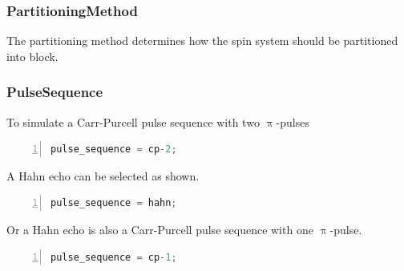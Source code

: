 \documentclass{book}
\begin{document}
\subsubsection{PartitioningMethod} %
The partitioning method determines how the spin system should be partitioned
into block. 
\subsubsection{PulseSequence} %
To simulate a Carr-Purcell pulse sequence with two $\uppi$-pulses   
\begin{lstlisting}[frame=single,numbers=left,language=c]
pulse_sequence = cp-2;
\end{lstlisting}
A Hahn echo can be selected as shown. 
\begin{lstlisting}[frame=single,numbers=left,language=c]
pulse_sequence = hahn;
\end{lstlisting}
Or a Hahn echo is also a Carr-Purcell pulse sequence with one $\uppi$-pulse.
\begin{lstlisting}[frame=single,numbers=left,language=c]
pulse_sequence = cp-1;
\end{lstlisting}
 
\end{document}
